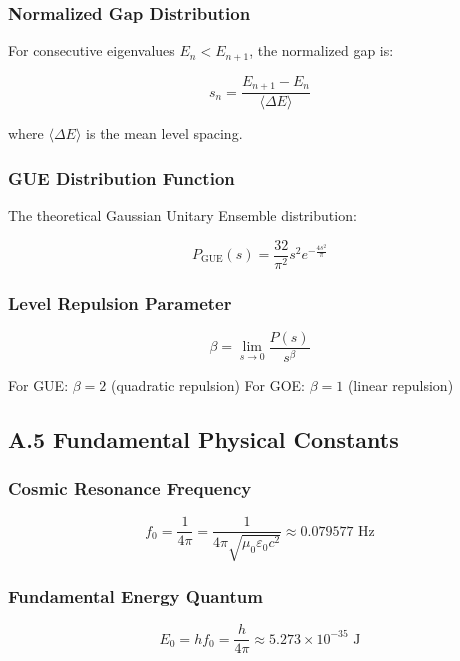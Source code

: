 \subsubsection*{Normalized Gap Distribution}
For consecutive eigenvalues $E_n < E_{n+1}$, the normalized gap is:

\begin{equation}
s_n = \frac{E_{n+1} - E_n}{\langle \Delta E \rangle} \label{eq:normalized_gap}
\end{equation}

where $\langle \Delta E \rangle$ is the mean level spacing.

\subsubsection*{GUE Distribution Function}
The theoretical Gaussian Unitary Ensemble distribution:

\begin{equation}
P_{\text{GUE}}(s) = \frac{32}{\pi^2} s^2 e^{-\frac{4s^2}{\pi}} \label{eq:gue_distribution}
\end{equation}

\subsubsection*{Level Repulsion Parameter}
\begin{equation}
\beta = \lim_{s \to 0} \frac{P(s)}{s^\beta} \label{eq:level_repulsion}
\end{equation}

For GUE: $\beta = 2$ (quadratic repulsion)
For GOE: $\beta = 1$ (linear repulsion)

\subsection*{A.5 Fundamental Physical Constants}

\subsubsection*{Cosmic Resonance Frequency}
\begin{equation}
f_0 = \frac{1}{4\pi} = \frac{1}{4\pi\sqrt{\mu_0 \varepsilon_0 c^2}} \approx 0.079577 \text{ Hz} \label{eq:fundamental_frequency}
\end{equation}

\subsubsection*{Fundamental Energy Quantum}
\begin{equation}
E_0 = h f_0 = \frac{h}{4\pi} \approx 5.273 \times 10^{-35} \text{ J} \label{eq:fundamental_energy}
\end{equation}

